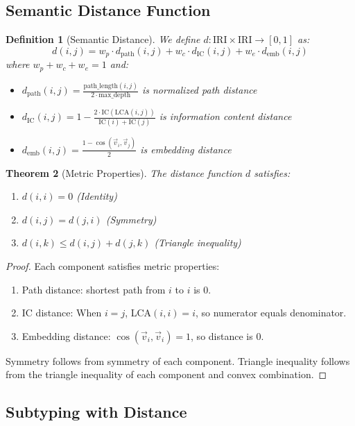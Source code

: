 \documentclass{article}
\newtheorem{theorem}{Theorem}[section]
\newtheorem{definition}[theorem]{Definition}
\begin{document}
\subsection{Semantic Distance Function}

\begin{definition}[Semantic Distance]
We define $d : \text{IRI} \times \text{IRI} \to [0, 1]$ as:
\[
d(i, j) = w_p \cdot d_{\text{path}}(i, j) + w_c \cdot d_{\text{IC}}(i, j) + w_e \cdot d_{\text{emb}}(i, j)
\]
where $w_p + w_c + w_e = 1$ and:
\begin{itemize}
\item $d_{\text{path}}(i, j) = \frac{\text{path\_length}(i, j)}{2 \cdot \text{max\_depth}}$ is normalized path distance
\item $d_{\text{IC}}(i, j) = 1 - \frac{2 \cdot \text{IC}(\text{LCA}(i,j))}{\text{IC}(i) + \text{IC}(j)}$ is information content distance
\item $d_{\text{emb}}(i, j) = \frac{1 - \cos(\vec{v}_i, \vec{v}_j)}{2}$ is embedding distance
\end{itemize}
\end{definition}

\begin{theorem}[Metric Properties]
The distance function $d$ satisfies:
\begin{enumerate}
\item $d(i, i) = 0$ \hfill (Identity)
\item $d(i, j) = d(j, i)$ \hfill (Symmetry)
\item $d(i, k) \leq d(i, j) + d(j, k)$ \hfill (Triangle inequality)
\end{enumerate}
\end{theorem}

\begin{proof}
Each component satisfies metric properties:
\begin{enumerate}
\item Path distance: shortest path from $i$ to $i$ is 0.
\item IC distance: When $i = j$, LCA$(i,i) = i$, so numerator equals denominator.
\item Embedding distance: $\cos(\vec{v}_i, \vec{v}_i) = 1$, so distance is 0.
\end{enumerate}
Symmetry follows from symmetry of each component. Triangle inequality follows
from the triangle inequality of each component and convex combination.
\end{proof}

\subsection{Subtyping with Distance}
\end{document}
